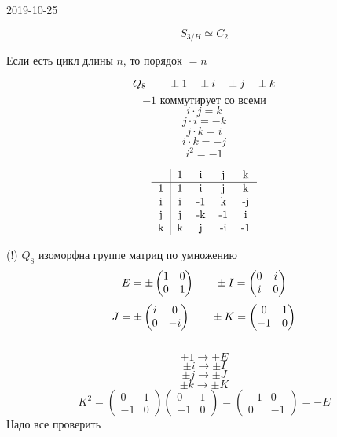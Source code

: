\documentclass[12pt, fleqn]{article}
\begin{document}
\begin{lect} {2019-10-25}
\begin{task}[3]
    \[S_{3/H} \simeq C_2\]
\end{task}

\begin{utv}
    Если есть цикл длины $n$, то порядок $= n$
\end{utv}

\begin{Reminder}
    \[Q_8 \qquad \pm 1 \quad \pm i \quad \pm j \quad \pm k\]
    \[-1 \text{ коммутирует со всеми}\]
    \[i \cdot j = k\]
    \[j \cdot i = -k\]
    \[j \cdot k = i\]
    \[i \cdot k = -j\]
    \[i^2 = -1\]

    \[\begin{tabular} {c|c c c c}
        &  1 & i & j & k\\ \hline
        1   &  1  & i & j & k\\
        i & i & -1 & k & -j\\
        j & j & -k & -1 & i\\
        k & k & j & -i & -1
    \end{tabular}\]
\end{Reminder}

\begin{task}[4]
    (!) \q $Q_8$ изоморфна группе матриц по умножению
    \[E = \pm \begin{pmatrix}
        1 & 0\\
        0 & 1
    \end{pmatrix} \qquad \pm I = \begin{pmatrix}
        0 & i\\
        i  &0
    \end{pmatrix}\]
    \[J = \pm\begin{pmatrix}
        i & 0\\
        0 & -i
    \end{pmatrix} \qquad \pm K = \begin{pmatrix}
        0 & 1\\
        -1 & 0
    \end{pmatrix}\]
    \\
    \[\pm 1 \to \pm E\]
    \[\pm i \to \pm I\]
    \[\pm j \to \pm J\]
    \[\pm k \to \pm K\]
    \[K^2 = \begin{pmatrix}
        0 & 1\\
        -1 & 0
    \end{pmatrix} \begin{pmatrix}
        0 & 1\\
        -1 & 0
    \end{pmatrix} = \begin{pmatrix}
        -1 & 0\\
         0 & -1
    \end{pmatrix} = -E\]
    Надо все проверить\\
\end{task}


\end{lect}
\end{document}
